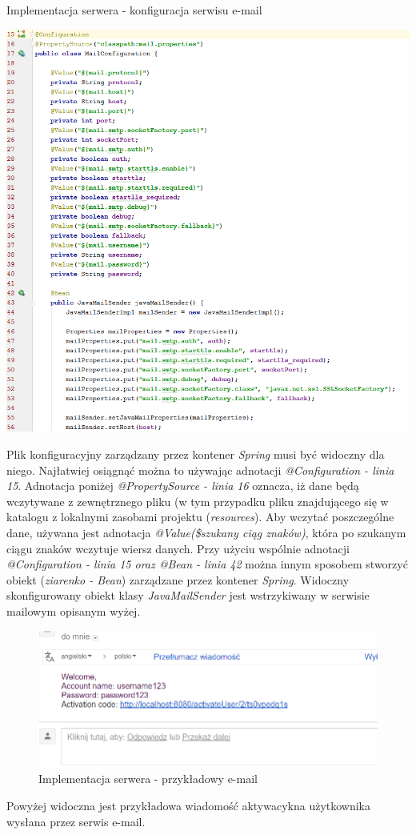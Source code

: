 \documentclass[10pt,titlepage]{article} %
\begin{document}
\begin{listing}[H]
\caption[Implementacja serwera - konfiguracja serwisu e-mail]{Implementacja serwera - konfiguracja serwisu e-mail}
\includegraphics[width=1.0\textwidth, height=0.8\textheight]{img/sekcja3/backend/konfiguracjaSerwisuMailowego}
\end{listing}
Plik konfiguracyjny zarządzany przez kontener \textit{Spring} musi być widoczny dla niego. Najłatwiej osiągnąć można to używając adnotacji \textit{@Configuration - linia 15}. Adnotacja poniżej \textit{@PropertySource - linia 16} oznacza, iż dane będą wczytywane z zewnętrznego pliku (w tym przypadku pliku znajdującego się w katalogu z lokalnymi zasobami projektu (\textit{resources}). Aby wczytać poszczególne dane, używana jest adnotacja \textit{@Value(\${szukany ciąg znaków})}, która po szukanym ciągu znaków wczytuje wiersz danych. Przy użyciu wspólnie adnotacji \textit{@Configuration - linia 15 oraz @Bean - linia 42} można innym sposobem stworzyć obiekt (\textit{ziarenko - Bean}) zarządzane przez kontener \textit{Spring}. Widoczny skonfigurowany obiekt klasy \textit{JavaMailSender} jest wstrzykiwany w serwisie mailowym opisanym wyżej.

\begin{figure}[H]
\includegraphics[width=\textwidth]{img/sekcja3/backend/przykladowyEmail}
\caption[Implementacja serwera - przykładowy e-mail]{Implementacja serwera - przykładowy e-mail}
\end{figure}
Powyżej widoczna jest przykładowa wiadomość aktywacykna użytkownika wysłana przez serwis e-mail. 
\end{document}
